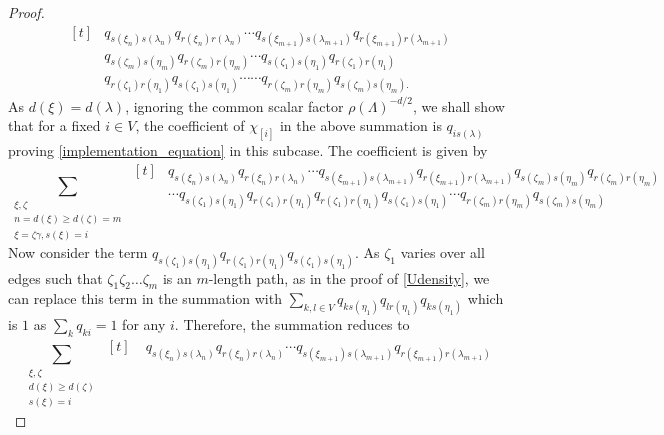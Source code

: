 \documentclass[10pt,a4paper]{amsart}
\begin{document}
\begin{proof}
\begin{equation*}
\begin{aligned}[t]
&q_{s(\xi_{n})s(\lambda_{n})}q_{r(\xi_{n})r(\lambda_{n})}
\cdots q_{s(\xi_{m+1})s(\lambda_{m+1})}q_{r(\xi_{m+1})r(\lambda_{m+1})}\\
&q_{s(\zeta_{m})s(\eta_{m})}q_{r(\zeta_{m})r(\eta_{m})}
\cdots
q_{s(\zeta_{1})s(\eta_{1})}q_{r(\zeta_{1})r(\eta_{1})}\\
&q_{r(\zeta_{1})r(\eta_{1})}q_{s(\zeta_{1})s(\eta_{1})}\cdots\cdots q_{r(\zeta_{m})r(\eta_{m})}q_{s(\zeta_{m})s(\eta_{m}).}
\end{aligned}
\end{equation*}
As $d(\xi)=d(\lambda)$, ignoring the common scalar factor $\rho(\Lambda)^{-d/2}$, we shall show that for a fixed $i\in V$, the coefficient of $\chi_{[i]}$ in the above summation is $q_{is(\lambda)}$ proving \ref{implementation_equation} in this subcase. The coefficient is given by
\begin{equation*}
    \sum\limits_{\substack{\xi,\zeta\\ n=d(\xi)\geq d(\zeta)=m \\ \xi=\zeta\gamma, s(\xi)=i}}
\begin{aligned}[t]
&q_{s(\xi_{n})s(\lambda_{n})}q_{r(\xi_{n})r(\lambda_{n})}
\cdots q_{s(\xi_{m+1})s(\lambda_{m+1})}q_{r(\xi_{m+1})r(\lambda_{m+1})}q_{s(\zeta_{m})s(\eta_{m})}q_{r(\zeta_{m})r(\eta_{m})}
\\
&\cdots q_{s(\zeta_{1})s(\eta_{1})}q_{r(\zeta_{1})r(\eta_{1})}q_{r(\zeta_{1})r(\eta_{1})}q_{s(\zeta_{1})s(\eta_{1})}\cdots q_{r(\zeta_{m})r(\eta_{m})}q_{s(\zeta_{m})s(\eta_{m})}
\end{aligned}
\end{equation*}
Now consider the term $q_{s(\zeta_{1})s(\eta_{1})}q_{r(\zeta_{1})r(\eta_{1})}q_{s(\zeta_{1})s(\eta_{1})}$. As $\zeta_{1}$ varies over all edges such that $\zeta_{1}\zeta_{2}\ldots\zeta_{m}$ is an $m$-length path, as in the proof of \ref{Udensity}, we can replace this term in the summation with $\sum_{k,l\in V}q_{ks(\eta_{1})}q_{lr(\eta_{1})}q_{ks(\eta_{1})}$ which is $1$ as $\sum_{k}q_{ki}=1$ for any $i$. Therefore, the summation reduces to
\begin{equation*}
    \sum\limits_{\substack{\xi,\zeta\\ d(\xi)\geq d(\zeta) \\
s(\xi)=i}}
\begin{aligned}[t]
&\;q_{s(\xi_{n})s(\lambda_{n})}q_{r(\xi_{n})r(\lambda_{n})}\cdots
q_{s(\xi_{m+1})s(\lambda_{m+1})}q_{r(\xi_{m+1})r(\lambda_{m+1})}
\\

\end{aligned}
\end{equation*}
\end{proof}
\end{document}

